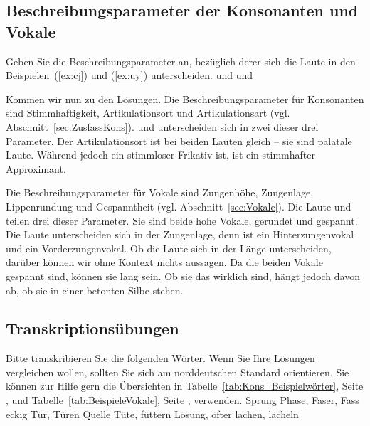 \subsection{Beschreibungsparameter der Konsonanten und Vokale}

Geben Sie die Beschreibungsparameter an, bezüglich derer sich die Laute in den Beispielen~(\ref{ex:cj}) und (\ref{ex:uy}) unterscheiden.
\ea
\ea \label{ex:cj} \textipa{[\c{c}]} und \textipa{[j]}
\ex \label{ex:uy} \textipa{[u]} und \textipa{[y]}
\z
\z

Kommen wir nun zu den Lösungen. Die Beschreibungsparameter für Konsonanten sind Stimmhaftigkeit, Artikulationsort und Artikulationsart (vgl. Abschnitt~\ref{sec:ZusfassKons}). \textipa{[\c{c}]} und \textipa{[j]} unterscheiden sich in zwei dieser drei Parameter. Der Artikulationsort ist bei beiden Lauten gleich -- sie sind palatale Laute. Während \textipa{[\c{c}]} jedoch ein stimmloser Frikativ ist, ist \textipa{[j]} ein stimmhafter Approximant.

Die Beschreibungsparameter für Vokale sind Zungenhöhe, Zungenlage, Lippenrundung und Gespanntheit (vgl. Abschnitt~\ref{sec:Vokale}). Die  Laute \textipa{[u]} und \textipa{[y]} teilen drei dieser Parameter. Sie sind beide hohe Vokale, gerundet und gespannt. Die Laute unterscheiden sich in der Zungenlage, denn \textipa{[u]} ist ein Hinterzungenvokal und \textipa{[y]} ein Vorderzungenvokal. Ob die Laute sich in der Länge unterscheiden, darüber können wir ohne Kontext nichts aussagen. Da die beiden Vokale gespannt sind, können sie lang sein. Ob sie das wirklich sind, hängt jedoch davon ab, ob sie in einer betonten Silbe stehen.

\subsection{Transkriptionsübungen}

Bitte transkribieren Sie die folgenden Wörter. Wenn Sie Ihre Lösungen vergleichen wollen, sollten Sie sich am norddeutschen Standard orientieren. Sie können zur Hilfe gern die Übersichten in Tabelle~\ref{tab:Kons_Beispielwörter}, Seite \pageref{tab:Kons_Beispielwörter}, und Tabelle~\ref{tab:BeispieleVokale}, Seite \pageref{tab:BeispieleVokale}, verwenden.
\ea
\ea \label{ex:Sprung} Sprung
\ex \label{ex:Phase} Phase, Faser, Fass
\ex \label{ex:eckig} eckig
\ex \label{ex:Tür} Tür, Türen
\ex \label{ex:Quelle} Quelle
\ex \label{ex:Tüte} Tüte, füttern
\ex \label{ex:Lösung} Lösung, öfter
\ex \label{ex:lachen1} lachen, lächeln
\z
\z

